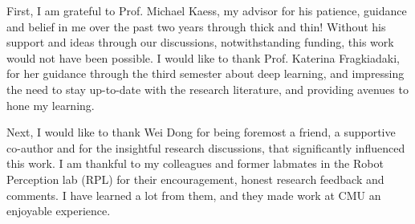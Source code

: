 
\setlength{\parskip}{1em}
\setlength{\parindent}{0em}

\noindent
First, I am grateful to Prof. Michael Kaess, my advisor for his patience, guidance and belief in me over the past two years through thick and thin! Without his support and ideas through our discussions, notwithstanding funding, this work would not have been possible. I would like to thank Prof. Katerina Fragkiadaki, for her guidance through the third semester about deep learning, and impressing the need to stay up-to-date  with the research literature, and providing avenues to hone my learning.

Next, I would like to thank Wei Dong for being foremost a friend, a supportive co-author and for the insightful research discussions, that significantly influenced this work. I am thankful to my colleagues and former labmates in the Robot Perception lab (RPL) for their encouragement, honest research feedback and comments. I have learned a lot from them, and they made work at CMU an enjoyable experience.

